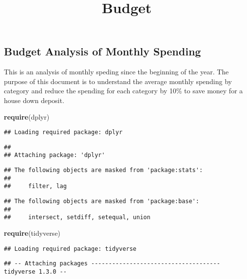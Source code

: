 \documentclass[
]{article}
\title{Budget}
\author{}
\date{\vspace{-2.5em}}
\newenvironment{Shaded}{\begin{snugshade}}{\end{snugshade}}
\newcommand{\KeywordTok}[1]{\textcolor[rgb]{0.13,0.29,0.53}{\textbf{#1}}}
\newcommand{\NormalTok}[1]{#1}
\begin{document}
\maketitle

\hypertarget{budget-analysis-of-monthly-spending}{%
\subsection{Budget Analysis of Monthly
Spending}\label{budget-analysis-of-monthly-spending}}

This is an analysis of monthly speding since the beginning of the year.
The purpose of this document is to understand the average monthly
spending by category and reduce the spending for each category by 10\%
to save money for a house down deposit.

\begin{Shaded}
\begin{Highlighting}[]
\KeywordTok{require}\NormalTok{(dplyr)}
\end{Highlighting}
\end{Shaded}

\begin{verbatim}
## Loading required package: dplyr
\end{verbatim}

\begin{verbatim}
## 
## Attaching package: 'dplyr'
\end{verbatim}

\begin{verbatim}
## The following objects are masked from 'package:stats':
## 
##     filter, lag
\end{verbatim}

\begin{verbatim}
## The following objects are masked from 'package:base':
## 
##     intersect, setdiff, setequal, union
\end{verbatim}

\begin{Shaded}
\begin{Highlighting}[]
\KeywordTok{require}\NormalTok{(tidyverse)}
\end{Highlighting}
\end{Shaded}

\begin{verbatim}
## Loading required package: tidyverse
\end{verbatim}

\begin{verbatim}
## -- Attaching packages ------------------------------------- tidyverse 1.3.0 --
\end{verbatim}
\end{document}
